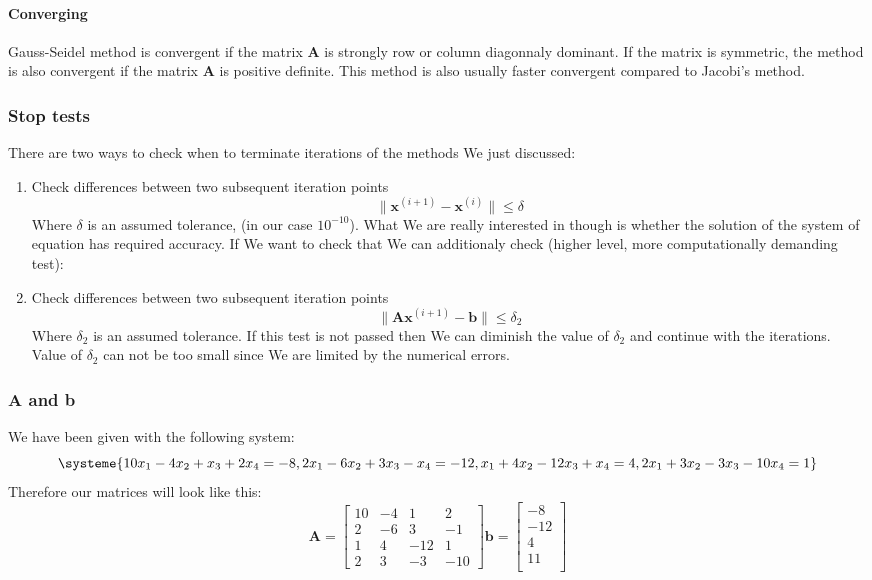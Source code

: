\documentclass{report}
\begin{document}
\paragraph{Converging}
Gauss-Seidel method is convergent if the matrix \textbf{A} is strongly row or column diagonnaly dominant. If the matrix is symmetric, the method is also convergent if the matrix \textbf{A} is positive definite. This method is also usually faster convergent compared to Jacobi's method.

\subsubsection{Stop tests}
There are two ways to check when to terminate iterations of the methods We just discussed:
\begin{enumerate}
\item Check differences between two subsequent iteration points
\[
\| \mathbf{x}^{(i+1)} - \mathbf{x}^{(i)} \| \leq \delta
\]
Where $\delta$ is an assumed tolerance, (in our case $10^{-10}$). What We are really interested in though is whether the solution of the system of equation has required accuracy. If We want to check that We can additionaly check (higher level, more computationally demanding test):
\item Check differences between two subsequent iteration points
\[
\| \mathbf{A}\mathbf{x}^{(i+1)} - \mathbf{b}\| \leq \delta_2
\]
Where $\delta_2$ is an assumed tolerance. If this test is not passed then We can diminish the value of $\delta_2$ and continue with the iterations. Value of $\delta_2$ can not be too small since We are limited by the numerical errors.
\end{enumerate}

\subsubsection{\textbf{A} and \textbf{b}}
We have been given with the following system:
\[
\systeme{10x_1-4x_2+x_3+2x_4=-8, 2x_1-6x_2+3x_3-x_4=-12, x_1+4x_2-12x_3+x_4=4, 2x_1+3x_2-3x_3-10x_4=1}
\]
Therefore our matrices will look like this:
\[
\textbf{A} = \begin{bmatrix}
10 & -4 & 1 & 2 \\
2 & -6 & 3 & -1 \\
1 & 4 & -12 & 1 \\
2 & 3 & -3 & -10
\end{bmatrix}
\textbf{b} = \begin{bmatrix}
-8 \\
-12 \\
4 \\
11 \\
\end{bmatrix}
\]
\end{document}
